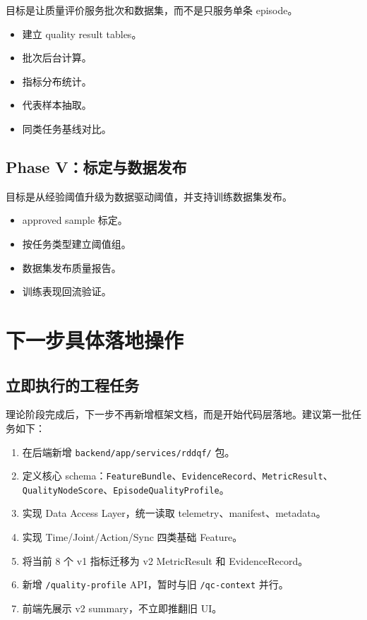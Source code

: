 \documentclass[UTF8,zihao=-4,oneside,openany]{ctexrep}
\newcommand{\Code}[1]{\texttt{#1}}
\begin{document}
目标是让质量评价服务批次和数据集，而不是只服务单条 episode。

\begin{itemize}
\item 建立 quality result tables。
\item 批次后台计算。
\item 指标分布统计。
\item 代表样本抽取。
\item 同类任务基线对比。
\end{itemize}

\subsection{Phase V：标定与数据发布}

目标是从经验阈值升级为数据驱动阈值，并支持训练数据集发布。

\begin{itemize}
\item approved sample 标定。
\item 按任务类型建立阈值组。
\item 数据集发布质量报告。
\item 训练表现回流验证。
\end{itemize}

\section{下一步具体落地操作}

\subsection{立即执行的工程任务}

理论阶段完成后，下一步不再新增框架文档，而是开始代码层落地。建议第一批任务如下：

\begin{enumerate}
\item 在后端新增 \Code{backend/app/services/rddqf/} 包。
\item 定义核心 schema：\Code{FeatureBundle}、\Code{EvidenceRecord}、\Code{MetricResult}、\Code{QualityNodeScore}、\Code{EpisodeQualityProfile}。
\item 实现 Data Access Layer，统一读取 telemetry、manifest、metadata。
\item 实现 Time/Joint/Action/Sync 四类基础 Feature。
\item 将当前 8 个 v1 指标迁移为 v2 MetricResult 和 EvidenceRecord。
\item 新增 \Code{/quality-profile} API，暂时与旧 \Code{/qc-context} 并行。
\item 前端先展示 v2 summary，不立即推翻旧 UI。
\end{enumerate}
\end{document}
